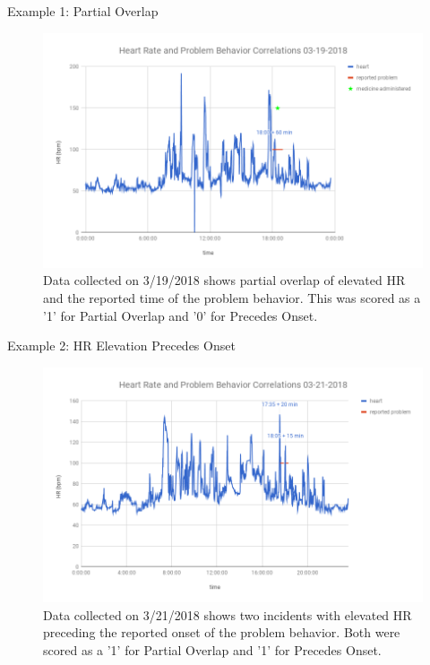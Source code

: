 \documentclass[final]{beamer}
\newlength{\onecolwid}
\newlength{\twocolwid}
\begin{document}
\begin{frame}[t]
\begin{columns}[t]
\begin{column}{\twocolwid}
\begin{columns}[t,totalwidth=\twocolwid]
\begin{column}{\onecolwid}

\begin{block}{Example 1: Partial Overlap}
	
	\begin{figure}
		\includegraphics[width=0.8\linewidth]{Example1.png}
		\caption{Data collected on 3/19/2018 shows partial overlap of elevated HR and the reported time of the problem behavior. This was scored as a '1' for Partial Overlap and '0' for Precedes Onset.}
	\end{figure}
	
\end{block}


\begin{block}{Example 2: HR Elevation Precedes Onset}
	
	\begin{figure}
		\includegraphics[width=0.8\linewidth]{Example2.png}
		\caption{Data collected on 3/21/2018 shows two incidents with elevated HR preceding the reported onset of the problem behavior. Both were scored as a '1' for Partial Overlap and '1' for Precedes Onset.}
	\end{figure}
	

\end{block}
\end{column}
\end{columns}
\end{column}
\end{columns}
\end{frame}
\end{document}
